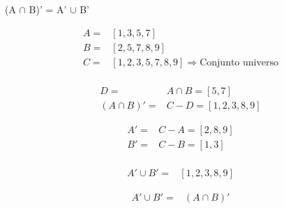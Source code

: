 \begin{question}
	(A $\cap$ B)' = A' $\cup$ B'

	\begin{equation}
	  \begin{split}
	  		A = & [1,3,5,7] \\
			B = & [2,5,7,8,9] \\
			C = & [1,2,3,5,7,8,9] \Rightarrow \text{Conjunto universo}\\
		\end{split}
	\end{equation}
	
	\begin{equation}
		\begin{aligned}
			D = & A \cap B = [5,7] \\
			(A \cap B)' = & C - D = [1,2,3,8,9] 
		\end{aligned}
	\end{equation}

	\begin{equation}
		\begin{aligned}
			A' = & C - A = [2,8,9] \\
			B' = & C - B = [1,3] \\
		\end{aligned}
	\end{equation}
	
	\begin{equation}
		\begin{aligned}
			A' \cup B' = &  [1,2,3,8,9]
		\end{aligned}
	\end{equation}
	
	\begin{equation}
		\begin{aligned}
			A' \cup B' = &  (A \cap B)'
		\end{aligned}
	\end{equation}
	
\end{question}